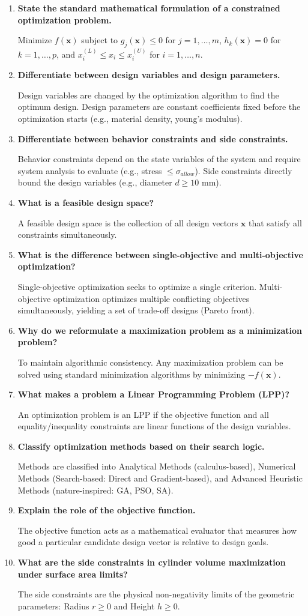 \documentclass[12pt,a4paper]{article}
\newcommand{\Q}[1]{\textbf{#1}\par\noindent\ignorespaces}
\begin{document}
\begin{tcolorbox}[exambox, title={\textbf{Frequently Asked / Viva Questions}}]
\begin{enumerate}[topsep=0pt, label=\textbf{Q\arabic*.}, itemsep=5pt]
  \item \Q{State the standard mathematical formulation of a constrained optimization problem.}
    Minimize $f(\mathbf{x})$ subject to $g_j(\mathbf{x}) \le 0$ for $j=1,\dots,m$, $h_k(\mathbf{x}) = 0$ for $k=1,\dots,p$, and $x_i^{(L)} \le x_i \le x_i^{(U)}$ for $i=1,\dots,n$.
  \item \Q{Differentiate between design variables and design parameters.}
    Design variables are changed by the optimization algorithm to find the optimum design. Design parameters are constant coefficients fixed before the optimization starts (e.g., material density, young's modulus).
  \item \Q{Differentiate between behavior constraints and side constraints.}
    Behavior constraints depend on the state variables of the system and require system analysis to evaluate (e.g., stress $\le \sigma_{allow}$). Side constraints directly bound the design variables (e.g., diameter $d \ge 10\text{ mm}$).
  \item \Q{What is a feasible design space?}
    A feasible design space is the collection of all design vectors $\mathbf{x}$ that satisfy all constraints simultaneously.
  \item \Q{What is the difference between single-objective and multi-objective optimization?}
    Single-objective optimization seeks to optimize a single criterion. Multi-objective optimization optimizes multiple conflicting objectives simultaneously, yielding a set of trade-off designs (Pareto front).
  \item \Q{Why do we reformulate a maximization problem as a minimization problem?}
    To maintain algorithmic consistency. Any maximization problem can be solved using standard minimization algorithms by minimizing $-f(\mathbf{x})$.
  \item \Q{What makes a problem a Linear Programming Problem (LPP)?}
    An optimization problem is an LPP if the objective function and all equality/inequality constraints are linear functions of the design variables.
  \item \Q{Classify optimization methods based on their search logic.}
    Methods are classified into Analytical Methods (calculus-based), Numerical Methods (Search-based: Direct and Gradient-based), and Advanced Heuristic Methods (nature-inspired: GA, PSO, SA).
  \item \Q{Explain the role of the objective function.}
    The objective function acts as a mathematical evaluator that measures how good a particular candidate design vector is relative to design goals.
  \item \Q{What are the side constraints in cylinder volume maximization under surface area limits?}
    The side constraints are the physical non-negativity limits of the geometric parameters: Radius $r \ge 0$ and Height $h \ge 0$.
\end{enumerate}
\end{tcolorbox}
\end{document}
